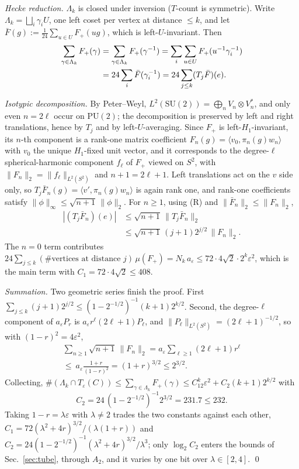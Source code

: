 \documentclass[aps,prx,twocolumn,superscriptaddress,nofootinbib,longbibliography]{revtex4-2}
\theoremstyle{plain}
\theoremstyle{definition}
\theoremstyle{remark}
\newcommand{\PU}{\mathrm{PU}(2)}
\newcommand{\SU}{\mathrm{SU}(2)}
\begin{document}
\emph{Hecke reduction.} $\Lambda_k$ is closed under inversion ($T$-count is symmetric). Write $\Lambda_k=\bigsqcup_i\gamma_iU$, one left coset per vertex at distance $\le k$, and let $\bar F(g):=\frac1{24}\sum_{u\in U}F_+(ug)$, which is left-$U$-invariant. Then
\begin{align}
\sum_{\gamma\in\Lambda_k}F_+(\gamma)&=\sum_{\gamma\in\Lambda_k}F_+(\gamma^{-1})=\sum_i\sum_{u\in U}F_+(u^{-1}\gamma_i^{-1})\notag\\
&=24\sum_i\bar F(\gamma_i^{-1})=24\sum_{j\le k}(T_j\bar F)(e).
\end{align}

\emph{Isotypic decomposition.} By Peter--Weyl, $L^2(\SU)=\bigoplus_nV_n\otimes V_n^*$, and only even $n=2\ell$ occur on $\PU$; the decomposition is preserved by left and right translations, hence by $T_j$ and by left-$U$-averaging. Since $F_+$ is left-$H_1$-invariant, its $n$-th component is a rank-one matrix coefficient $F_n(g)=\langle v_0,\pi_n(g)w_n\rangle$ with $v_0$ the unique $H_1$-fixed unit vector, and it corresponds to the degree-$\ell$ spherical-harmonic component $f_\ell$ of $F_+$ viewed on $S^2$, with $\|F_n\|_2=\|f_\ell\|_{L^2(S^2)}$ and $n+1=2\ell+1$. Left translations act on the $v$ side only, so $T_j\bar F_n(g)=\langle v',\pi_n(g)w_n\rangle$ is again rank one, and rank-one coefficients satisfy $\|\phi\|_\infty\le\sqrt{n+1}\,\|\phi\|_2$. For $n\ge1$, using (R) and $\|\bar F_n\|_2\le\|F_n\|_2$,
\begin{equation}
\begin{aligned}
|(T_j\bar F_n)(e)|&\le\sqrt{n+1}\,\|T_j\bar F_n\|_2\\
&\le\sqrt{n+1}\,(j+1)2^{j/2}\,\|F_n\|_2 .
\end{aligned}
\end{equation}
The $n=0$ term contributes $24\sum_{j\le k}(\#\text{vertices at distance }j)\,\mu(F_+)=N_k\,a_\varepsilon\le72\cdot4\sqrt2\cdot2^k\varepsilon^2$, which is the main term with $C_1=72\cdot4\sqrt2\le408$.

\emph{Summation.} Two geometric series finish the proof. First $\sum_{j\le k}(j+1)2^{j/2}\le(1-2^{-1/2})^{-1}(k+1)2^{k/2}$. Second, the degree-$\ell$ component of $a_\varepsilon P_r$ is $a_\varepsilon r^\ell(2\ell+1)P_\ell$, and $\|P_\ell\|_{L^2(S^2)}=(2\ell+1)^{-1/2}$, so with $(1-r)^2=4\varepsilon^2$,
\begin{multline}
\sum_{n\ge1}\sqrt{n+1}\,\|F_n\|_2=a_\varepsilon\!\sum_{\ell\ge1}(2\ell+1)r^\ell\\
\le\ a_\varepsilon\frac{1+r}{(1-r)^2}=(1+r)^{3/2}\le2^{3/2}.
\end{multline}
Collecting, $\#(\Lambda_k\cap T_\varepsilon(C))\le\sum_{\gamma\in\Lambda_k}F_+(\gamma)\le C_12^k\varepsilon^2+C_2(k+1)2^{k/2}$ with
\begin{equation}
C_2=24\,(1-2^{-1/2})^{-1}2^{3/2}=231.7\le232 .
\end{equation}
Taking $1-r=\lambda\varepsilon$ with $\lambda\ne2$ trades the two constants against each other, $C_1=72(\lambda^2+4r)^{3/2}/(\lambda(1+r))$ and $C_2=24(1-2^{-1/2})^{-1}(\lambda^2+4r)^{3/2}/\lambda^3$; only $\log_2C_2$ enters the bounds of Sec.~\ref{sec:tube}, through $A_2$, and it varies by one bit over $\lambda\in[2,4]$. \qed
\end{document}
